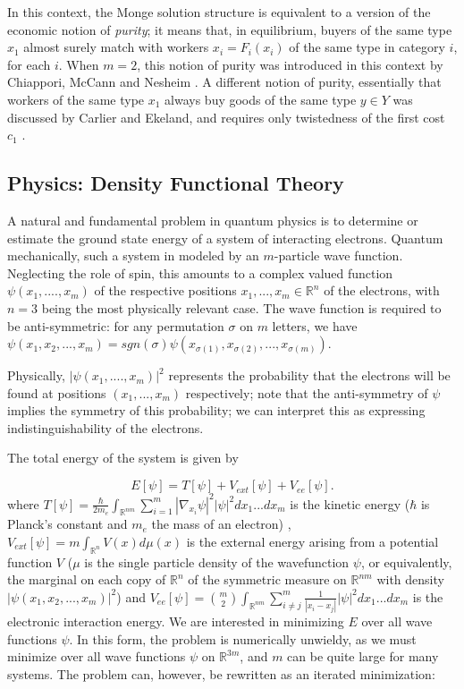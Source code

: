 \documentclass[letter,10pt]{article}
\theoremstyle{dotless}
\begin{document}
In this context, the Monge solution structure is equivalent to a version of the economic notion of \emph{purity}; it means that, in equilibrium, buyers of the same type $x_1$ almost surely match with workers $x_i =F_i(x_i)$ of the same type in category $i$, for each $i$.  When $m=2$, this notion of purity was introduced in this context by Chiappori, McCann and Nesheim \cite{cmn}.  A different notion of purity, essentially that workers of the same type $x_1$ always buy goods of the same type $y \in Y$ was discussed by Carlier and Ekeland, and requires only twistedness of the first cost $c_1$ \cite{CE}.
\subsection{Physics: Density Functional Theory}
A natural and fundamental problem in quantum physics is to determine or estimate the ground state energy of a system of interacting electrons.  Quantum mechanically, such a system in modeled by an $m$-particle wave function.  Neglecting the role of spin, this amounts to a complex valued function $\psi(x_1,....,x_m)$ of the respective positions $x_1,...,x_m \in \mathbb{R}^n$ of the electrons, with $n=3$ being the most physically relevant case.  The wave function is required to be anti-symmetric: for any permutation $\sigma$ on $m$ letters, we have $\psi(x_1,x_2,...,x_m) = sgn(\sigma)\psi(x_{\sigma(1)},x_{\sigma(2)},...,x_{\sigma(m)})$.  

Physically, $|\psi(x_1,....,x_m)|^2$ represents the probability that the electrons will be found at positions $(x_1,...,x_m)$ respectively; note that the anti-symmetry of $\psi$ implies the symmetry of this probability; we can interpret this as expressing  indistinguishability of the electrons.

The total energy of the system is given by 

\begin{equation}
E[\psi] = T[\psi] + V_{ext}[\psi] + V_{ee}[\psi]. 
\end{equation}
where $T[\psi] = \frac{\hbar}{2m_e}\int_{\mathbb{R}^{nm}}\sum_{i=1}^m|\nabla_{x_i} \psi|^2|\psi|^2dx_1...dx_m$ is the kinetic energy ($\hbar$ is Planck's constant and $m_e$ the mass of an electron) , $V_{ext}[\psi] = m\int_{\mathbb{R}^n}V(x)d\mu(x)$ is the external energy arising from a potential function $V$ ($\mu$ is the single particle density of the wavefunction $\psi$,  or equivalently, the marginal on each copy of $\mathbb{R}^n$ of the symmetric measure on $\mathbb{R}^{nm}$ with density $|\psi(x_1,x_2,...,x_m)|^2$) and  $V_{ee}[\psi] = {m \choose 2}\int_{\mathbb{R}^{nm}} \sum_{i \neq j}^m \frac{1}{|x_i-x_j| }|\psi|^2dx_1...dx_m$ is the electronic interaction energy.  We are interested in minimizing $E$ over all wave functions $\psi$.  In this form, the problem is numerically unwieldy, as we must minimize over all wave functions $\psi$ on $\mathbb{R}^{3m}$, and $m$ can be quite large for many systems.  The problem can, however, be rewritten as an iterated minimization:
\end{document}
